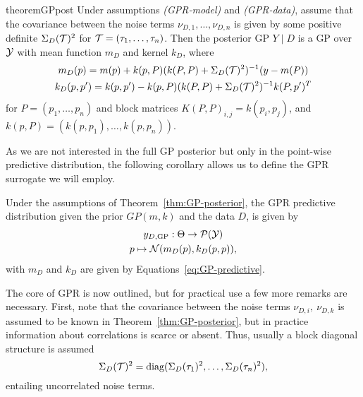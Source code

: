 \begin{restatable}[GP posterior]{theorem}{GPpost} \label{thm:GP-posterior}
    Under assumptions \textit{(GPR-model)} and \textit{(GPR-data)}, assume that the covariance between the noise terms $\nu_{D,1},\dots,\nu_{D,n}$ is given by some positive definite $\Sigma_D(\mathcal T)^2$ for $\mathcal T = (\tau_1, \ldots, \tau_n)$. \newline
    Then the posterior GP $Y \mid D$ is a GP over $\mathcal Y$ with mean function $m_D$ and kernel $k_D$, where
    \begin{equation} \label{eq:GP-predictive}
        \begin{gathered}
            m_D(p) = m(p) + k(p, P) (k(P,P) + \Sigma_D(\mathcal T)^2 )^{-1} (y - m(P))  \\
            k_D(p, p') = k(p, p') - k(p, P) (k(P,P) + \Sigma_D(\mathcal T)^2 )^{-1} k(P, p')^T            
        \end{gathered}
    \end{equation}
    for $P = (p_1, \ldots, p_n)$ and block matrices $K(P,P)_{i,j} = k(p_i, p_j)$, and $k(p, P) = (k(p, p_1), \ldots, k(p, p_n))$.
\end{restatable}

As we are not interested in the full GP posterior but only in the point-wise predictive distribution, the following corollary allows us to define the GPR surrogate we will employ.
\begin{cor}
    Under the assumptions of Theorem~\ref{thm:GP-posterior}, the GPR predictive distribution given the prior $GP(m,k)$ and the data $D$, is given by 
    \begin{gather*}
        y_{D, \text{GP}} : \Theta \rightarrow \mathcal P( \mathcal Y) \\
        p \mapsto \mathcal N( m_D(p), k_D(p,p) ),
    \end{gather*}
    with $m_D$ and $k_D$ are given by Equations~\eqref{eq:GP-predictive}.
\end{cor}

The core of GPR is now outlined, but for practical use a few more remarks are necessary. \newline
First, note that the covariance between the noise terms $\nu_{D,i}, \ \nu_{D,k}$ is assumed to be known in Theorem~\ref{thm:GP-posterior}, but in practice information about correlations is scarce or absent. Thus, usually a block diagonal structure is assumed 
\begin{equation} \label{eq:GPR-noise-corr}
    \Sigma_D(\mathcal T)^2 = \text{diag}(\Sigma_D(\tau_1)^2, \ldots, \Sigma_D(\tau_n)^2),
\end{equation}
entailing uncorrelated noise terms.

